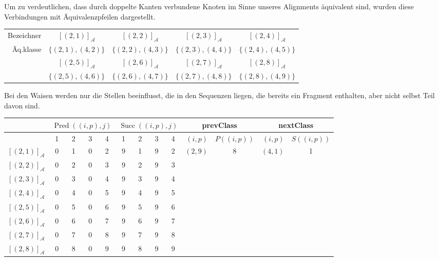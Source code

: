 Um zu verdeutlichen, dass durch doppelte Kanten verbundene Knoten im Sinne unseres Alignments äquivalent sind, wurden diese Verbindungen mit Äquivalenzpfeilen dargestellt.

\small
\begin{tabular}{|r||c|c|c|c|}
	\hline
	Bezeichner 	& $[(2,1)]_{\mathcal{A}}$ & $[(2,2)]_{\mathcal{A}}$ & $[(2,3)]_{\mathcal{A}}$ & $[(2,4)]_{\mathcal{A}}$\\
	Äq.klasse  & $\{(2,1),(4,2)\}$	      & $\{(2,2),(4,3)\}$       & $\{(2,3),(4,4)\}$       & $\{(2,4),(4,5)\}$        \\
	\hline
	            & $[(2,5)]_{\mathcal{A}}$ & $[(2,6)]_{\mathcal{A}}$ & $[(2,7)]_{\mathcal{A}}$ & $[(2,8)]_{\mathcal{A}}$\\
	            & $\{(2,5),(4,6)\}$       & $\{(2,6),(4,7)\}$       & $\{(2,7),(4,8)\}$       & $\{(2,8),(4,9)\}$  \\
	\hline
\end{tabular}
\normalsize

Bei den Waisen werden nur die Stellen beeinflusst, die in den Sequenzen liegen, die bereits ein Fragment enthalten, aber nicht selbst Teil davon sind.

\vspace{5pt}

\small
\begin{tabular}{|r|cccc|cccc||r|c|r|c|}
	\hline
	 & \multicolumn{4}{c|}{$\operatorname{Pred}((i,p),j)$} & \multicolumn{4}{c||}{$\operatorname{Succ}((i,p),j)$} & \multicolumn{2}{c|}{\textrm{prevClass}} & \multicolumn{2}{c}{\textrm{nextClass}} \\ \hline
	\diagbox[dir=NW]{$(i,p)$}{$j$} & 1 & 2 & 3 & 4 & 1 & 2 & 3 & 4 & $(i,p)$ & $P((i,p))$ & $(i,p)$ & $S((i,p))$ \\ \hline
	$[(2,1)]_{\mathcal{A}}$ & 0 & 1 & 0 & 2 & 9 & 1 & 9 & 2 & $(2,9)$ & 8 & $(4,1)$ & 1 \\
	$[(2,2)]_{\mathcal{A}}$ & 0 & 2 & 0 & 3 & 9 & 2 & 9 & 3 & & & & \\
	$[(2,3)]_{\mathcal{A}}$ & 0 & 3 & 0 & 4 & 9 & 3 & 9 & 4 & & & & \\
	$[(2,4)]_{\mathcal{A}}$ & 0 & 4 & 0 & 5 & 9 & 4 & 9 & 5 & & & & \\
	$[(2,5)]_{\mathcal{A}}$ & 0 & 5 & 0 & 6 & 9 & 5 & 9 & 6 & & & & \\
	$[(2,6)]_{\mathcal{A}}$ & 0 & 6 & 0 & 7 & 9 & 6 & 9 & 7 & & & & \\
	$[(2,7)]_{\mathcal{A}}$ & 0 & 7 & 0 & 8 & 9 & 7 & 9 & 8 & & & & \\
	$[(2,8)]_{\mathcal{A}}$ & 0 & 8 & 0 & 9 & 9 & 8 & 9 & 9 & & & & \\
	\hline
\end{tabular}
\normalsize
\vspace{5pt}


